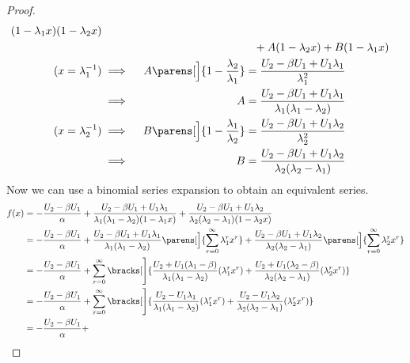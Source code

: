 \begin{proof}
\begin{alignat*}
                     (1 - \lambda_1 x)(1 - \lambda_2 x) \\
  && &\phantom{\equiv} + A(1 - \lambda_2 x) + B(1 - \lambda_1 x) \\
  (x = \lambda_1^{-1}) &\implies{}&
   A\parens[\Big]{1 - \frac{\lambda_2}{\lambda_1}}
   &= \frac{U_2 - \beta U_1 + U_1 \lambda_1}{\lambda_1^2} \\
  &\implies{}& A &= \frac{U_2 - \beta U_1 + U_1 \lambda_1}
                         {\lambda_1(\lambda_1 - \lambda_2)} \\
  (x = \lambda_2^{-1}) &\implies{}&
   B\parens[\Big]{1 - \frac{\lambda_1}{\lambda_2}}
   &= \frac{U_2 - \beta U_1 + U_1 \lambda_2}{\lambda_2^2} \\
  &\implies{}& B &= \frac{U_2 - \beta U_1 + U_1 \lambda_2}
                         {\lambda_2(\lambda_2 - \lambda_1)}
 \end{alignat*}
 Now we can use a binomial series expansion to obtain an equivalent series.
 \begin{align*}
  f(x) &= -\frac{U_2 - \beta U_1}\alpha +
           \frac{U_2 - \beta U_1 + U_1 \lambda_1}
                {\lambda_1(\lambda_1 - \lambda_2)(1 - \lambda_1 x)} +
           \frac{U_2 - \beta U_1 + U_1 \lambda_2}
                {\lambda_2(\lambda_2 - \lambda_1)(1 - \lambda_2 x)} \\
       &= -\frac{U_2 - \beta U_1}\alpha +
           \frac{U_2 - \beta U_1 + U_1 \lambda_1}
                {\lambda_1(\lambda_1 - \lambda_2)}
                \parens[\Big]{\sum_{r = 0}^\infty \lambda_1^r x^r} +
           \frac{U_2 - \beta U_1 + U_1 \lambda_2}
                {\lambda_2(\lambda_2 - \lambda_1)}
                \parens[\Big]{\sum_{r = 0}^\infty \lambda_2^r x^r} \\
       &= -\frac{U_2 - \beta U_1}\alpha +
          \sum_{r = 0}^\infty \bracks[\Bigg]{
           \frac{U_2 + U_1(\lambda_1 - \beta)}
                {\lambda_1(\lambda_1 - \lambda_2)}
            (\lambda_1^r x^r) +
           \frac{U_2 + U_1(\lambda_2 - \beta)}
                {\lambda_2(\lambda_2 - \lambda_1)}
            (\lambda_2^r x^r)
          } \\
       &= -\frac{U_2 - \beta U_1}\alpha +
          \sum_{r = 0}^\infty \bracks[\Bigg]{
           \frac{U_2 - U_1 \lambda_1}
                {\lambda_1(\lambda_1 - \lambda_2)}
            (\lambda_1^r x^r) +
           \frac{U_2 - U_1 \lambda_2}
                {\lambda_2(\lambda_2 - \lambda_1)}
            (\lambda_2^r x^r)
          } \\
       &= -\frac{U_2 - \beta U_1}\alpha +

\end{align*}
\end{proof}

